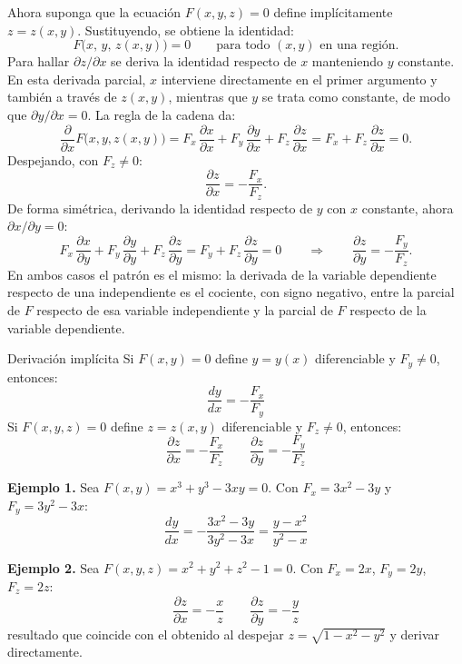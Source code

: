 Ahora suponga que la ecuación $F(x, y, z) = 0$ define implícitamente $z = z(x, y)$. Sustituyendo, se obtiene la identidad:
\[
F\bigl(x,\, y,\, z(x, y)\bigr) = 0 \qquad \text{para todo } (x, y) \text{ en una región.}
\]
Para hallar $\partial z / \partial x$ se deriva la identidad respecto de $x$ manteniendo $y$ constante. En esta derivada parcial, $x$ interviene directamente en el primer argumento y también a través de $z(x, y)$, mientras que $y$ se trata como constante, de modo que $\partial y / \partial x = 0$. La regla de la cadena da:
\[
\frac{\partial}{\partial x}F\bigl(x, y, z(x,y)\bigr)
= F_x\,\frac{\partial x}{\partial x} + F_y\,\frac{\partial y}{\partial x} + F_z\,\frac{\partial z}{\partial x}
= F_x + F_z\,\frac{\partial z}{\partial x} = 0.
\]
Despejando, con $F_z \neq 0$:
\[
\frac{\partial z}{\partial x} = -\frac{F_x}{F_z}.
\]
De forma simétrica, derivando la identidad respecto de $y$ con $x$ constante, ahora $\partial x / \partial y = 0$:
\[
F_x\,\frac{\partial x}{\partial y} + F_y\,\frac{\partial y}{\partial y} + F_z\,\frac{\partial z}{\partial y}
= F_y + F_z\,\frac{\partial z}{\partial y} = 0
\qquad\Longrightarrow\qquad
\frac{\partial z}{\partial y} = -\frac{F_y}{F_z}.
\]
En ambos casos el patrón es el mismo: la derivada de la variable dependiente respecto de una independiente es el cociente, con signo negativo, entre la parcial de $F$ respecto de esa variable independiente y la parcial de $F$ respecto de la variable dependiente.

\begin{mytheorem}{Derivación implícita}
Si $F(x, y) = 0$ define $y = y(x)$ diferenciable y $F_y \neq 0$, entonces:
\[
\frac{dy}{dx} = -\frac{F_x}{F_y}
\]
Si $F(x, y, z) = 0$ define $z = z(x,y)$ diferenciable y $F_z \neq 0$, entonces:
\[
\frac{\partial z}{\partial x} = -\frac{F_x}{F_z}
\qquad
\frac{\partial z}{\partial y} = -\frac{F_y}{F_z}
\]
\end{mytheorem}

\textbf{Ejemplo 1.} Sea $F(x,y) = x^3 + y^3 - 3xy = 0$. Con $F_x = 3x^2 - 3y$ y $F_y = 3y^2 - 3x$:
\[
\frac{dy}{dx} = -\frac{3x^2 - 3y}{3y^2 - 3x} = \frac{y - x^2}{y^2 - x}
\]

\textbf{Ejemplo 2.} Sea $F(x, y, z) = x^2 + y^2 + z^2 - 1 = 0$. Con $F_x = 2x$, $F_y = 2y$, $F_z = 2z$:
\[
\frac{\partial z}{\partial x} = -\frac{x}{z}
\qquad
\frac{\partial z}{\partial y} = -\frac{y}{z}
\]
resultado que coincide con el obtenido al despejar $z = \sqrt{1 - x^2 - y^2}$ y derivar directamente.

